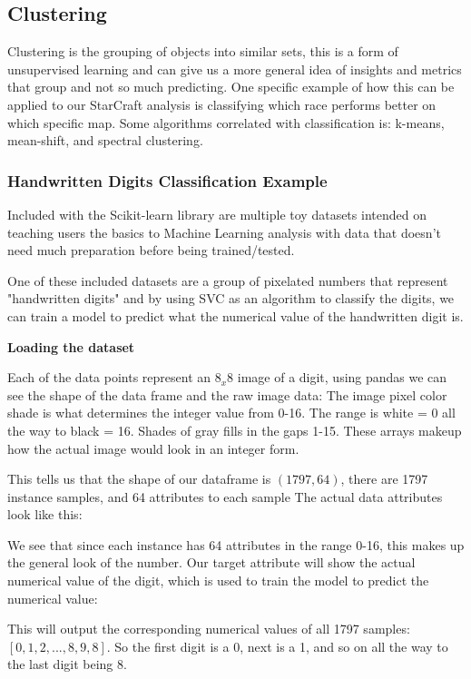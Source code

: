 \documentclass[a4paper,12pt]{report}
\newcommand{\msection}[1]{\noindent\textbf{#1}}
\begin{document}
\subsection{Clustering}
Clustering is the grouping of objects into similar sets, this is a form of unsupervised learning and can give us a more general idea of insights and metrics that group and not so much predicting. One specific example of how this can be applied to our StarCraft analysis is classifying which race performs better on which specific map. Some algorithms correlated with classification is: k-means, mean-shift, and spectral clustering.

\subsubsection{Handwritten Digits Classification Example}

Included with the Scikit-learn library are multiple toy datasets intended on teaching users the basics to Machine Learning analysis with data that doesn’t need much preparation before being trained/tested.

One of these included datasets are a group of pixelated numbers that represent "handwritten digits" and by using SVC as an algorithm to classify the digits, we can train a model to predict what the numerical value of the handwritten digit is.

\msection{Loading the dataset}

Each of the data points represent an $8_x8$ image of a digit, using pandas we can see the shape of the data frame and the raw image data:
The image pixel color shade is what determines the integer value from 0-16. The range is white = 0 all the way to black = 16. Shades of gray fills in the gaps 1-15. These arrays makeup how the actual image would look in an integer form.	

This tells us that the shape of our dataframe is $(1797, 64)$, there are 1797 instance samples, and 64 attributes to each sample
The actual data attributes look like this:


We see that since each instance has 64 attributes in the range 0-16, this makes up the general look of the number. Our target attribute will show the actual numerical value of the digit, which is used to train the model to predict the numerical value:


This will output the corresponding numerical values of all 1797 samples: $[0, 1, 2, ..., 8, 9, 8]$. So the first digit is a 0, next is a 1, and so on all the way to the last digit being 8.
\end{document}
